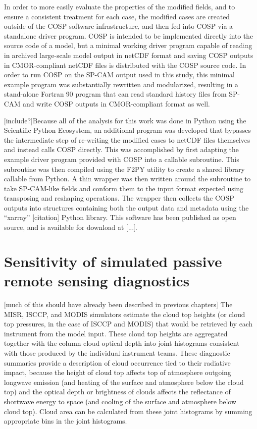 In order to more easily evaluate the properties of the modified fields, and to ensure a consistent treatment for each case, the modified cases are created outside of the COSP software infrastructure, and then fed into COSP via a standalone driver program. COSP is intended to be implemented directly into the source code of a model, but a minimal working driver program capable of reading in archived large-scale model output in netCDF format and saving COSP outputs in CMOR-compliant netCDF files is distributed with the COSP source code. In order to run COSP on the SP-CAM output used in this study, this minimal example program was substantially rewritten and modularized, resulting in a stand-alone Fortran 90 program that can read standard history files from SP-CAM and write COSP outputs in CMOR-compliant format as well.

[include?]Because all of the analysis for this work was done in Python using the Scientific Python Ecosystem, an additional program was developed that bypasses the intermediate step of re-writing the modified cases to netCDF files themselves and instead calls COSP directly. This was accomplished by first adapting the example driver program provided with COSP into a callable subroutine. This subroutine was then compiled using the F2PY utility to create a shared library callable from Python. A thin wrapper was then written around the subroutine to take SP-CAM-like fields and conform them to the input format expected using transposing and reshaping operations. The wrapper then collects the COSP outputs into structures containing both the output data and metadata using the ``xarray'' [citation] Python library. This software has been published as open source, and is available for download at [...].

\section{Sensitivity of simulated passive remote sensing diagnostics} 
[much of this should have already been described in previous chapters] The MISR, ISCCP, and MODIS simulators estimate the cloud top heights (or cloud top pressures, in the case of ISCCP and MODIS) that would be retrieved by each instrument from the model input. These cloud top heights are aggregated together with the column cloud optical depth into joint histograms consistent with those produced by the individual instrument teams. These diagnostic summaries provide a description of cloud occurrence tied to their radiative impact, because the height of cloud top affects top of atmosphere outgoing longwave emission (and heating of the surface and atmosphere below the cloud top) and the optical depth or brightness of clouds affects the reflectance of shortwave energy to space (and cooling of the surface and atmosphere below cloud top). Cloud area can be calculated from these joint histograms by summing appropriate bins in the joint histograms. 

